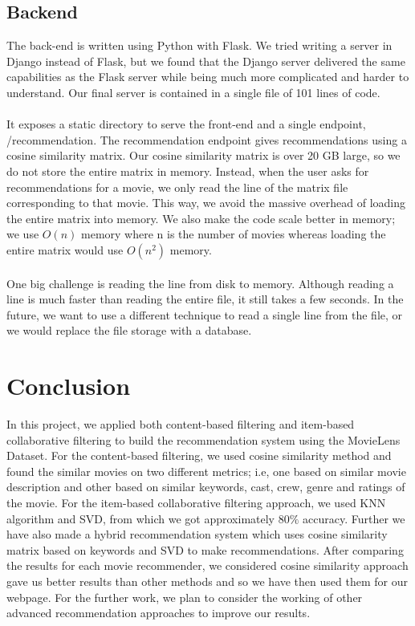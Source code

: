 \documentclass[10pt,conference]{IEEEtran}
\begin{document}
\subsection{\textbf{Backend}}
The back-end is written using Python with Flask. We tried writing a server in Django instead of Flask, but we found that the Django server delivered the same capabilities as the Flask server while being much more complicated and harder to understand. Our final server is contained in a single file of 101 lines of code.\\\\
It exposes a static directory to serve the front-end and a single endpoint, /recommendation. The recommendation endpoint gives recommendations using a cosine similarity matrix. Our cosine similarity matrix is over 20 GB large, so we do not store the entire matrix in memory. Instead, when the user asks for recommendations for a movie, we only read the line of the matrix file corresponding to that movie. This way, we avoid the massive overhead of loading the entire matrix into memory. We also make the code scale better in memory; we use ${O(n)}$ memory where n is the number of movies whereas loading the entire matrix would use ${O(n^2)}$ memory.\\\\
One big challenge is reading the line from disk to memory. Although reading a line is much faster than reading the entire file, it still takes a few seconds. In the future, we want to use a different technique to read a single line from the file, or we would replace the file storage with a database.

\section{Conclusion}\label{sec:5. Conclusion}
In this project, we applied both content-based filtering and item-based collaborative filtering to build the recommendation system using the MovieLens Dataset. For the content-based filtering, we used cosine similarity method and found the similar movies on two different metrics; i.e, one based on similar movie description and other based on similar keywords, cast, crew, genre and ratings of the movie. For the item-based collaborative filtering approach, we used KNN algorithm and SVD, from which we got approximately ${80\%}$ accuracy. Further we have also made a hybrid recommendation system which uses cosine similarity matrix based on keywords and SVD to make recommendations. After comparing the results for each movie recommender, we considered cosine similarity approach gave us better results than other methods and so we have then used them for our webpage. For the further work, we plan to consider the working of other advanced recommendation approaches to improve our results.
\end{document}

